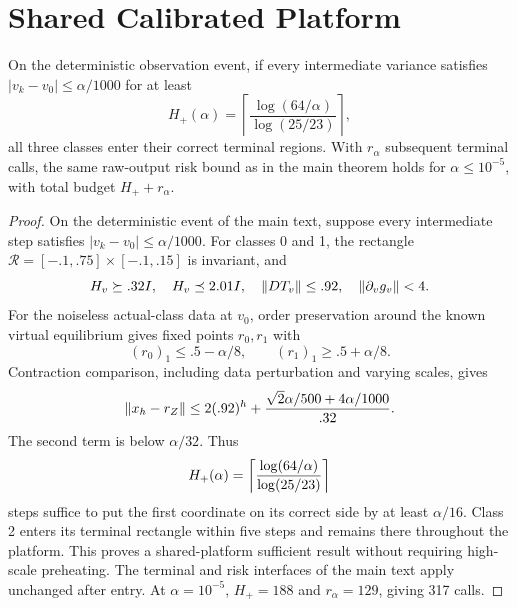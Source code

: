 \documentclass[10pt,twocolumn,letterpaper]{article}
\begin{document}
\section{Shared Calibrated Platform}
\begin{proposition}\label{prop:common}
On the deterministic observation event, if every intermediate variance satisfies $|v_k-v_0|\le\alpha/1000$ for at least
\begin{equation}\label{eq:hplus}
H_+(\alpha)=\left\lceil\frac{\log(64/\alpha)}{\log(25/23)}\right\rceil,
\end{equation}
all three classes enter their correct terminal regions. With $r_\alpha$ subsequent terminal calls, the same raw-output risk bound as in the main theorem holds for $\alpha\le10^{-5}$, with total budget $H_++r_\alpha$.
\end{proposition}
\begin{proof}
On the deterministic event of the main text, suppose every intermediate step satisfies $|v_k-v_0|\le\alpha/1000$. For classes 0 and 1, the rectangle $\mathcal R=[-.1,.75]\times[-.1,.15]$ is invariant, and
\begin{equation}
H_v\succeq.32I,\quad H_v\preceq2.01I,\quad
\lVert DT_v\rVert\le.92,\quad\lVert\partial_vg_v\rVert<4.
\end{equation}
For the noiseless actual-class data at $v_0$, order preservation around the known virtual equilibrium gives fixed points $r_0,r_1$ with
\begin{equation}
(r_0)_1\le.5-\alpha/8,\qquad(r_1)_1\ge.5+\alpha/8.
\end{equation}
Contraction comparison, including data perturbation and varying scales, gives
\begin{equation}
\lVert x_h-r_Z\rVert\le2(.92)^h+
{\sqrt2\alpha/500+4\alpha/1000\over.32}.
\end{equation}
The second term is below $\alpha/32$. Thus
\begin{equation}
H_+(\alpha)=\left\lceil{\log(64/\alpha)\over\log(25/23)}\right\rceil
\end{equation}
steps suffice to put the first coordinate on its correct side by at least $\alpha/16$. Class 2 enters its terminal rectangle within five steps and remains there throughout the platform. This proves a shared-platform sufficient result without requiring high-scale preheating. The terminal and risk interfaces of the main text apply unchanged after entry. At $\alpha=10^{-5}$, $H_+=188$ and $r_\alpha=129$, giving 317 calls.
\end{proof}
\end{document}
